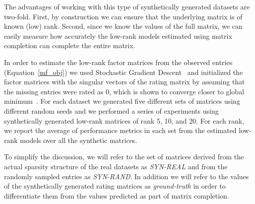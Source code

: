 The advantages of working with this type of synthetically generated datasets are
two-fold. First, by construction we can ensure that the underlying matrix is of known
(low) rank. Second, since we know the values of the full matrix, we can easily
measure how accurately the low-rank models estimated using matrix completion can
complete the entire matrix. 


In order to estimate the low-rank factor matrices from the observed entries
(Equation~\ref{mf_obj}) we used Stochastic Gradient Descent~\cite{bottou2010large} and
initialized the factor matrices with the singular vectors of the rating matrix by
assuming that the missing entries were rated as 0, which is shown to converge closer
to global minimum~\cite{JainSanghavi13}. 
%
For each dataset we generated five different sets of matrices using different random
seeds and we performed a series of experiments using synthetically generated low-rank
matrices of rank 5, 10, and 20. For each rank, we report the average of performance
metrics in each set from the estimated low-rank models over all the synthetic
matrices.

To simplify the discussion, we will refer to the set of matrices derived from the
actual sparsity structure of the real datasets as \emph{SYN-REAL} and from the
randomly sampled entries as \emph{SYN-RAND}. In addition we will refer to the values
of the synthetically generated rating matrices as \emph{ground-truth} in order
to differentiate them from the values predicted as part of matrix completion.

